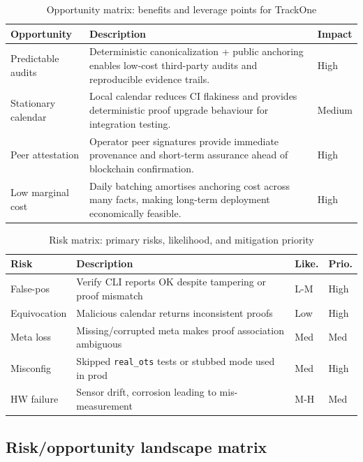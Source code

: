\begin{table}[H]
  \centering
  \caption{Opportunity matrix: benefits and leverage points for TrackOne}
  \begin{tabularx}{\textwidth}{l X l}
    \toprule
    \textbf{Opportunity} & \textbf{Description} & \textbf{Impact} \\
    \midrule
    Predictable audits & Deterministic canonicalization + public anchoring enables low-cost third-party audits and reproducible evidence trails.
    & High \\
    \addlinespace
    Stationary calendar & Local calendar reduces \ac{CI} flakiness and provides deterministic proof upgrade behaviour for integration testing.
    & Medium \\
    \addlinespace
    Peer attestation & Operator peer signatures provide immediate provenance and short-term assurance ahead of blockchain confirmation.
    & High \\
    \addlinespace
    Low marginal cost & Daily batching amortises anchoring cost across many facts, making long-term deployment economically feasible.
    & High \\
    \bottomrule
  \end{tabularx}
\end{table}
\begin{table}[H]
  \centering
  \caption{Risk matrix: primary risks, likelihood, and mitigation priority}
  \begin{tabularx}{\textwidth}{l X l l}
    \toprule
    \textbf{Risk} & \textbf{Description} & \textbf{Like.} & \textbf{Prio.} \\
    \midrule
    False-pos & Verify \ac{CLI} reports OK despite tampering or proof mismatch & L-M & High \\
    \addlinespace
    Equivocation & Malicious calendar returns inconsistent proofs & Low & High \\
    \addlinespace
    Meta loss & Missing/corrupted meta makes proof association ambiguous & Med & Med \\
    \addlinespace
    Misconfig & Skipped \texttt{real\_ots} tests or stubbed mode used in prod & Med & High \\
    \addlinespace
    HW failure & Sensor drift, corrosion leading to mis-measurement & M-H & Med \\
    \bottomrule
  \end{tabularx}
\end{table}

\subsection{Risk/opportunity landscape matrix}

